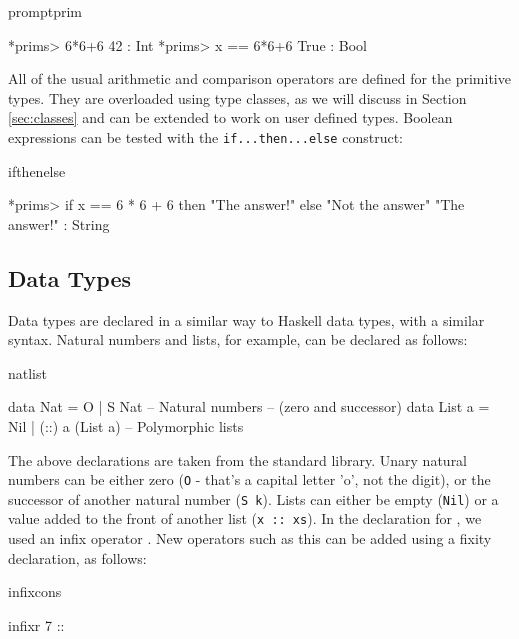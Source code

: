 \begin{SaveVerbatim}{promptprim}

*prims> 6*6+6
42 : Int
*prims> x == 6*6+6
True : Bool

\end{SaveVerbatim}

\noindent
All of the usual arithmetic and comparison operators are defined for the primitive
types. They are overloaded using type classes, as we will discuss in Section
\ref{sec:classes} and can be extended to work on user defined types.
Boolean expressions can be tested with the \texttt{if...then...else} construct:

\begin{SaveVerbatim}{ifthenelse}

*prims> if x == 6 * 6 + 6 then "The answer!" else "Not the answer"
"The answer!" : String

\end{SaveVerbatim}

\subsection{Data Types}

Data types are declared in a similar way to Haskell data types, with a similar
syntax. Natural numbers and lists, for example, can be declared as follows:

\begin{SaveVerbatim}{natlist}

data Nat    = O   | S Nat           -- Natural numbers
                                    -- (zero and successor)
data List a = Nil | (::) a (List a) -- Polymorphic lists

\end{SaveVerbatim}

\noindent
The above declarations are taken from the standard library. Unary natural
numbers can be either zero (\texttt{O} - that's a capital letter 'o', not the digit), or
the successor of another natural number (\texttt{S k}). 
Lists can either be empty (\texttt{Nil})
or a value added to the front of another list (\texttt{x :: xs}).
In the declaration for , we used an infix operator \tDC{::}. New operators
such as this can be added using a fixity declaration, as follows:

\begin{SaveVerbatim}{infixcons}

infixr 7 :: 

\end{SaveVerbatim}

